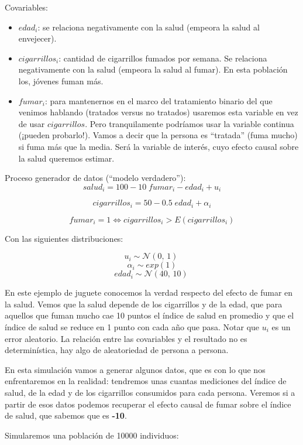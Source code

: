 \documentclass[
  a4paper,
  DIV=11,
  numbers=noendperiod]{scrreprt}
\providecommand{\tightlist}{%
  \setlength{\itemsep}{0pt}\setlength{\parskip}{0pt}}\usepackage{longtable,booktabs,array}
\begin{document}
Covariables:

\begin{itemize}
\tightlist
\item
  \(edad_i\): se relaciona negativamente con la salud (empeora la salud
  al envejecer).
\item
  \(cigarrillos_i\): cantidad de cigarrillos fumados por semana. Se
  relaciona negativamente con la salud (empeora la salud al fumar). En
  esta población los, jóvenes fuman más.\\
\item
  \(fumar_i\): para mantenernos en el marco del tratamiento binario del
  que venimos hablando (tratados versus no tratados) usaremos esta
  variable en vez de usar \(cigarrillos\). Pero tranquilamente podríamos
  usar la variable continua (¡pueden probarlo!). Vamos a decir que la
  persona es ``tratada'' (fuma mucho) si fuma más que la media. Será la
  variable de interés, cuyo efecto causal sobre la salud queremos
  estimar.
\end{itemize}

Proceso generador de datos (``modelo verdadero''): \[
salud_i = 100  - 10  \; fumar_i - edad_i +  u_i
\]

\[
cigarrillos_i = 50 -  0.5  \; edad_i + \alpha_i
\]

\[
fumar_i = 1 ⇔ cigarrillos_i > E(cigarrillos_i)
\]

Con las siguientes distribuciones:

\[ u_i \sim \mathcal{N}(0,\,1)\ \] \[ \alpha_i \sim exp(1) \]
\[ edad_i \sim \mathcal{N}(40,\,10)\  \]

En este ejemplo de juguete conocemos la verdad respecto del efecto de
fumar en la salud. Vemos que la salud depende de los cigarrillos y de la
edad, que para aquellos que fuman mucho cae 10 puntos el índice de salud
en promedio y que el índice de salud se reduce en 1 punto con cada año
que pasa. Notar que \(u_i\) es un error aleatorio. La relación entre las
covariables y el resultado no es determinística, hay algo de
aleatoriedad de persona a persona.

En esta simulación vamos a generar algunos datos, que es con lo que nos
enfrentaremos en la realidad: tendremos unas cuantas mediciones del
índice de salud, de la edad y de los cigarrillos consumidos para cada
persona. Veremos si a partir de esos datos podemos recuperar el efecto
causal de fumar sobre el índice de salud, que sabemos que es
\textbf{-10}.

Simularemos una población de 10000 individuos:
\end{document}

